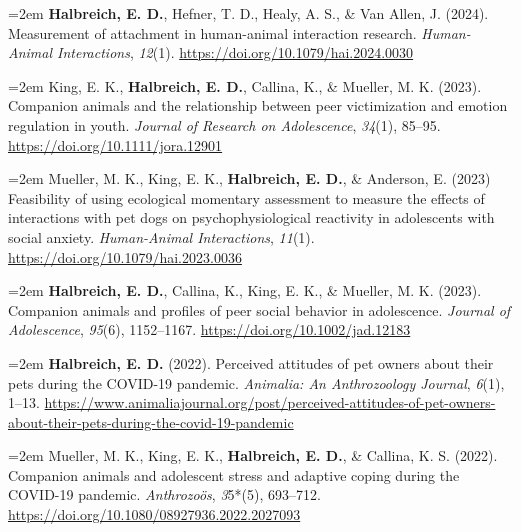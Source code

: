 \documentclass[letter,11pt]{article}
\begin{document}
\hangindent=2em
\textbf{Halbreich, E. D.}, Hefner, T. D., Healy, A. S., \& Van Allen, J. (2024). Measurement of attachment in human-animal interaction research. \textit{Human-Animal Interactions}, \textit{12}(1). \href{https://doi.org/10.1079/hai.2024.0030}{https://doi.org/10.1079/hai.2024.0030}
\vspace{1mm}

\hangindent=2em
King, E. K., \textbf{Halbreich, E. D.}, Callina, K., \& Mueller, M. K. (2023). Companion animals and the relationship between peer victimization and emotion regulation in youth. \textit{Journal of Research on Adolescence}, \textit{34}(1), 85--95. \href{https://doi.org/10.1111/jora.12901}{https://doi.org/10.1111/jora.12901}
\vspace{1mm}

\hangindent=2em
Mueller, M. K., King, E. K., \textbf{Halbreich, E. D.}, \& Anderson, E. (2023) Feasibility of using ecological momentary assessment to measure the effects of interactions with pet dogs on psychophysiological reactivity in adolescents with social anxiety. \textit{Human-Animal Interactions}, \textit{11}(1). \href{https://doi.org/10.1079/hai.2023.0036}{https://doi.org/10.1079/hai.2023.0036}
\vspace{1mm}

\hangindent=2em
\textbf{Halbreich, E. D.}, Callina, K., King, E. K., \& Mueller, M. K. (2023). Companion animals and profiles of peer social behavior in adolescence. \textit{Journal of Adolescence}, \textit{95}(6), 1152--1167. \href{https://doi.org/10.1002/jad.12183}{https://doi.org/10.1002/jad.12183}
\vspace{1mm}

\hangindent=2em
\textbf{Halbreich, E. D.} (2022). Perceived attitudes of pet owners about their pets during the COVID-19 pandemic. \textit{Animalia: An Anthrozoology Journal}, \textit{6}(1), 1--13. \href{https://www.animaliajournal.org/post/perceived-attitudes-of-pet-owners-about-their-pets-during-the-covid-19-pandemic}{https://www.animaliajournal.org/post/perceived-attitudes-of-pet-owners-about-their-pets-during-the-covid-19-pandemic}
\vspace{1mm}

\hangindent=2em
Mueller, M. K., King, E. K., \textbf{Halbreich, E. D.}, \& Callina, K. S. (2022). Companion animals and adolescent stress and adaptive coping during the COVID-19 pandemic. \textit{Anthrozoös}, \textit35*(5), 693--712. \href{https://doi.org/10.1080/08927936.2022.2027093}{https://doi.org/10.1080/08927936.2022.2027093}
\vspace{1mm}
\end{document}
